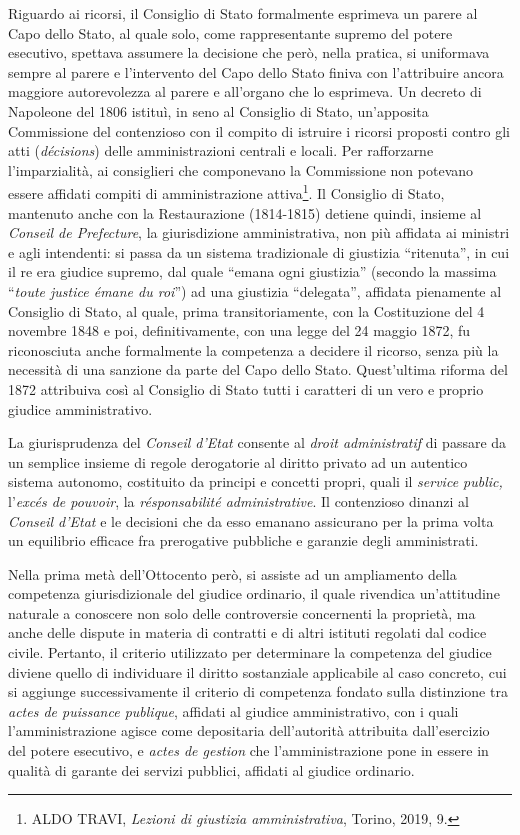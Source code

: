 \documentclass[12pt,it,a4paper,]{report}
\begin{document}
Riguardo ai ricorsi, il Consiglio di Stato formalmente esprimeva un
parere al Capo dello Stato, al quale solo, come rappresentante supremo
del potere esecutivo, spettava assumere la decisione che però, nella
pratica, si uniformava sempre al parere e l'intervento del Capo dello
Stato finiva con l'attribuire ancora maggiore autorevolezza al parere e
all'organo che lo esprimeva. Un decreto di Napoleone del 1806 istituì,
in seno al Consiglio di Stato, un'apposita Commissione del contenzioso
con il compito di istruire i ricorsi proposti contro gli atti
(\emph{décisions}) delle amministrazioni centrali e locali. Per
rafforzarne l'imparzialità, ai consiglieri che componevano la
Commissione non potevano essere affidati compiti di amministrazione
attiva\footnote{ALDO TRAVI, \emph{Lezioni di giustizia amministrativa},
  Torino, 2019, 9.}. Il Consiglio di Stato, mantenuto anche con la
Restaurazione (1814-1815) detiene quindi, insieme al \emph{Conseil de
Prefecture}, la giurisdizione amministrativa, non più affidata ai
ministri e agli intendenti: si passa da un sistema tradizionale di
giustizia ``ritenuta'', in cui il re era giudice supremo, dal quale
``emana ogni giustizia'' (secondo la massima ``\emph{toute justice émane
du roi}'') ad una giustizia ``delegata'', affidata pienamente al
Consiglio di Stato, al quale, prima transitoriamente, con la
Costituzione del 4 novembre 1848 e poi, definitivamente, con una legge
del 24 maggio 1872, fu riconosciuta anche formalmente la competenza a
decidere il ricorso, senza più la necessità di una sanzione da parte del
Capo dello Stato. Quest'ultima riforma del 1872 attribuiva così al
Consiglio di Stato tutti i caratteri di un vero e proprio giudice
amministrativo.

La giurisprudenza del \emph{Conseil d'Etat} consente al \emph{droit
administratif} di passare da un semplice insieme di regole derogatorie
al diritto privato ad un autentico sistema autonomo, costituito da
principi e concetti propri, quali il \emph{service public,}
l'\emph{excés de pouvoir}, la \emph{résponsabilité administrative}. Il
contenzioso dinanzi al \emph{Conseil d'Etat} e le decisioni che da esso
emanano assicurano per la prima volta un equilibrio efficace fra
prerogative pubbliche e garanzie degli amministrati.

Nella prima metà dell'Ottocento però, si assiste ad un ampliamento della
competenza giurisdizionale del giudice ordinario, il quale rivendica
un'attitudine naturale a conoscere non solo delle controversie
concernenti la proprietà, ma anche delle dispute in materia di contratti
e di altri istituti regolati dal codice civile. Pertanto, il criterio
utilizzato per determinare la competenza del giudice diviene quello di
individuare il diritto sostanziale applicabile al caso concreto, cui si
aggiunge successivamente il criterio di competenza fondato sulla
distinzione tra \emph{actes de puissance publique}, affidati al giudice
amministrativo, con i quali l'amministrazione agisce come depositaria
dell'autorità attribuita dall'esercizio del potere esecutivo, e
\emph{actes de gestion} che l'amministrazione pone in essere in qualità
di garante dei servizi pubblici, affidati al giudice ordinario.
\end{document}
